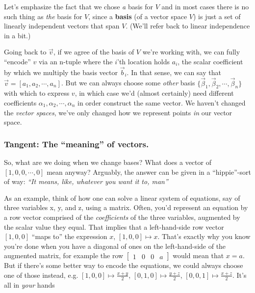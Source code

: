\documentclass[../main/main.tex]{subfiles}
\begin{document}


Let's emphasize the fact that we chose \emph{a} basis for \(V\)
and in most cases there is no such thing as \emph{the} basis for \(V\), since a
\textbf{basis} (of a vector space \(V\))
is just a set of linearly independent vectors that span \(V\).
(We'll refer back to linear independence in a bit.)\par

Going back to \(\vec{v}\), if we agree of the basis of \(V\) we're working with,
we can fully ``encode'' \(v\) via an n-tuple where the \(i\)'th location holds \(a_i\),
the scalar coefficient by which we multiply the basis vector \(\vec{b}_i\).
In that sense, we can say that \(\vec{v} = \left[a_1, a_2, \cdots, a_n\right]\).
But we can always choose some \emph{other} basis
\(\{\vec{\beta}_1, \vec{\beta}_2, \cdots, \vec{\beta}_n\}\)
with which to express \(v\), in which case we'd (almost certainly) need different coefficients
\(\alpha_1, \alpha_2, \cdots, \alpha_n\) in order construct the same vector.
We haven't changed the \emph{vector spaces}, we've only changed how we represent points
\emph{in} our vector space.\par

\subsubsection*{Tangent: The ``meaning'' of vectors.}

So, what are we doing when we change bases? What does a vector of
\(\left[1, 0, 0, \cdots, 0\right]\) mean anyway?
Arguably, the answer can be given in a ``hippie''-sort of way:
\textit{``It means, like, whatever you want it to, man\texttildelow''}\par

As an example, think of how one can solve a linear system of equations,
say of three variables x, y, and z,
using a matrix.
Often, you'd represent an equation by a row vector comprised of
the \emph{coefficients} of the three variables,
augmented by the scalar value they equal. That implies that
a left-hand-side row vector \([1, 0, 0]\) ``maps to'' the expression \(x\),
\([1,0,0] \mapsto x\). That's exactly why you know you're done when you have a 
diagonal of ones on the left-hand-side of the augmented matrix, for example the row
\(
\left[
\begin{array}{ccc|c}
1 & 0 & 0 & a
\end{array}
\right]
\)
would mean that \(x=a\).
But if there's some better way to encode the equations, we could always choose
one of those instead, e.g.
\([1,0,0] \mapsto \frac{x+y}{2}\), 
\([0,1,0] \mapsto \frac{y+z}{2}\),
\([0,0,1] \mapsto \frac{x+z}{2}\).
It's all in \emph{your} hands \texttildelow\par
\end{document}
